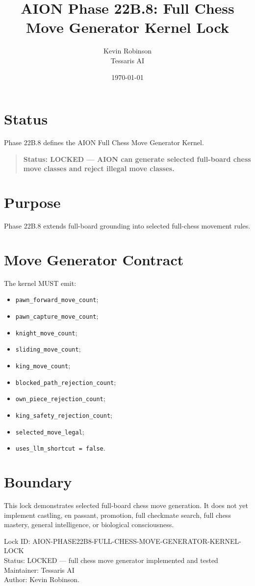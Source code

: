 \documentclass[11pt,a4paper]{article}
\title{\textbf{AION Phase 22B.8: Full Chess Move Generator Kernel Lock}}
\author{Kevin Robinson\\Tessaris AI}
\date{\today}
\begin{document}
\maketitle

\section{Status}

Phase 22B.8 defines the AION Full Chess Move Generator Kernel.

\begin{quote}
\textbf{Status: LOCKED --- AION can generate selected full-board chess move classes and reject illegal move classes.}
\end{quote}

\section{Purpose}

Phase 22B.8 extends full-board grounding into selected full-chess movement rules.

\section{Move Generator Contract}

The kernel MUST emit:

\begin{itemize}
  \item \texttt{pawn\_forward\_move\_count};
  \item \texttt{pawn\_capture\_move\_count};
  \item \texttt{knight\_move\_count};
  \item \texttt{sliding\_move\_count};
  \item \texttt{king\_move\_count};
  \item \texttt{blocked\_path\_rejection\_count};
  \item \texttt{own\_piece\_rejection\_count};
  \item \texttt{king\_safety\_rejection\_count};
  \item \texttt{selected\_move\_legal};
  \item \texttt{uses\_llm\_shortcut = false}.
\end{itemize}

\section{Boundary}

This lock demonstrates selected full-board chess move generation. It does not yet implement castling, en passant, promotion, full checkmate search, full chess mastery, general intelligence, or biological consciousness.

\bigskip

\noindent
Lock ID: AION-PHASE22B8-FULL-CHESS-MOVE-GENERATOR-KERNEL-LOCK\\
Status: LOCKED --- full chess move generator implemented and tested\\
Maintainer: Tessaris AI\\
Author: Kevin Robinson.
\end{document}
